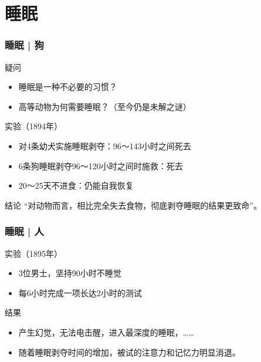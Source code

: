 \section{睡眠}
\begin{frame}
  \frametitle{睡眠 | 狗}
  \begin{block}{疑问}
    \begin{itemize}
      \item 睡眠是一种不必要的习惯？
      \item 高等动物为何需要睡眠？（至今仍是未解之谜）
    \end{itemize}
  \end{block}
  \pause
  \begin{block}{实验（1894年）}
    \begin{itemize}
      \item 对4条幼犬实施睡眠剥夺：96～143小时之间死去
      \item 6条狗睡眠剥夺96～120小时之间时施救：死去
      \item 20～25天不进食：仍能自我恢复
    \end{itemize}
  \end{block}
  \pause
  \begin{block}{结论}
    “对动物而言，相比完全失去食物，彻底剥夺睡眠的结果更致命”。
  \end{block}
\end{frame}

\begin{frame}
  \frametitle{睡眠 | 人}
  \begin{block}{实验（1895年）}
    \begin{itemize}
      \item 3位男士，坚持90小时不睡觉
      \item 每6小时完成一项长达2小时的测试
    \end{itemize}
  \end{block}
  \pause
  \begin{block}{结果}
    \begin{itemize}
      \item 产生幻觉，无法电击醒，进入最深度的睡眠，……
      \item 随着睡眠剥夺时间的增加，被试的注意力和记忆力明显消退。
    \end{itemize}
  \end{block}
\end{frame}

